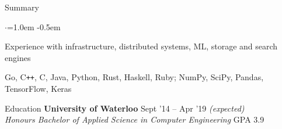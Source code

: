 \documentclass{resume} %
\begin{document}

\begin{rSection}{Summary}
  \vspace{0.5em}
  \begin{list}{$\cdot$}{\leftmargin=1.0em}
    \itemsep -0.5em \vspace{-0.5em}
    \item Experience with infrastructure, distributed systems, ML, storage and
      search engines
    \item Go, C\texttt{++}, C, Java, Python, Rust, Haskell, Ruby; NumPy, SciPy,
      Pandas, TensorFlow, Keras
  \end{list}
  \vspace{0.5em}
\end{rSection}


\begin{rSection}{Education}
  {\bf University of Waterloo} \hfill {Sept '14 -- Apr '19 \em (expected)} \\
  {\em Honours Bachelor of Applied Science in Computer Engineering} \hfill {GPA 3.9}
  \vspace{0.5em}
\end{rSection}

\end{document}
